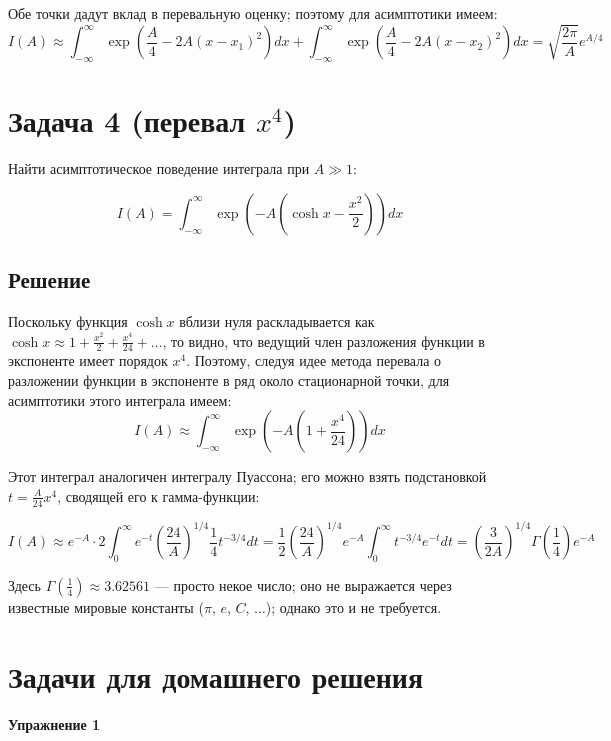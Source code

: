\documentclass[a4paper,12pt]{article}
\begin{document}
\noindent
Обе точки дадут вклад в перевальную оценку; поэтому для асимптотики
имеем:
\[
I\left(A\right)\approx\int_{-\infty}^{\infty}\exp\left(\frac{A}{4}-2A(x-x_{1})^{2}\right)dx+\int_{-\infty}^{\infty}\exp\left(\frac{A}{4}-2A(x-x_{2})^{2}\right)dx=\sqrt{\frac{2\pi}{A}}e^{A/4}
\]



\section*{Задача 4 (перевал $x^4$)}

Найти асимптотическое поведение интеграла при $A\gg1$:

\[
I\left(A\right)=\int_{-\infty}^{\infty}\exp\left(-A\left(\cosh x-\frac{x^{2}}{2}\right)\right)dx
\]



\subsection*{Решение}

Поскольку функция $\cosh x$ вблизи нуля раскладывается как $\cosh x\approx1+\frac{x^{2}}{2}+\frac{x^{4}}{24}+\dots$,
то видно, что ведущий член разложения функции в экспоненте имеет порядок
$x^{4}$. Поэтому, следуя идее метода перевала о разложении функции
в экспоненте в ряд около стационарной точки, для асимптотики этого
интеграла имеем:
\[
I(A)\approx\int_{-\infty}^{\infty}\exp\left(-A\left(1+\frac{x^{4}}{24}\right)\right)dx
\]

\noindent
Этот интеграл аналогичен интегралу Пуассона; его можно взять подстановкой
$t=\frac{A}{24}x^{4}$, сводящей его к гамма-функции:

\[
I(A)\approx e^{-A}\cdot2\int_{0}^{\infty}e^{-t}\left(\frac{24}{A}\right)^{1/4}\frac{1}{4}t^{-3/4}dt=\frac{1}{2}\left(\frac{24}{A}\right)^{1/4}e^{-A}\int_{0}^{\infty}t^{-3/4}e^{-t}dt=\left(\frac{3}{2A}\right)^{1/4}\Gamma\left(\frac{1}{4}\right)e^{-A}
\]

\noindent
Здесь $\Gamma\left(\frac{1}{4}\right)\approx3.62561$ --- просто некое
число; оно не выражается через известные мировые константы ($\pi$,
$e$, $C$, $\dots$); однако это и не требуется.

\section*{Задачи для домашнего решения}

\noindent \textbf{Упражнение 1}
\end{document}
